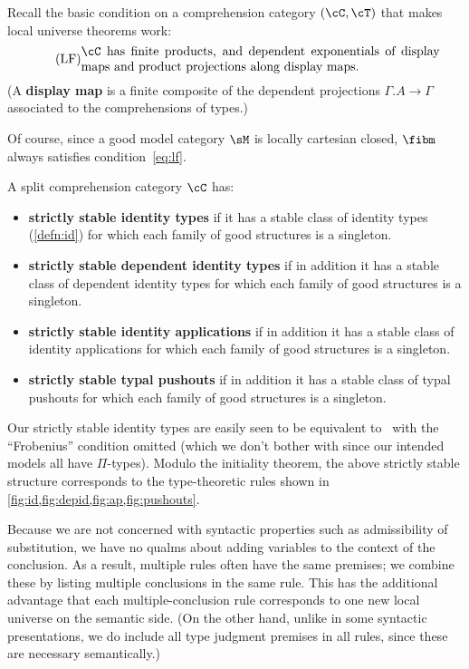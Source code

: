 \documentclass{amsart}
\let\C\cC
\let\T\cT
\begin{document}
Recall the basic condition on a comprehension category $(\C,\T)$ that makes local universe theorems work:
\begin{equation}
  \label{eq:lf}
  \tag{LF} \parbox{10cm}{$\C$ has finite products, and dependent exponentials of display maps and product projections along display maps.}
\end{equation}
(A \textbf{display map} is a finite composite of the dependent projections $\Gamma.A\to\Gamma$ associated to the comprehensions of types.)

Of course, since a good model category $\sM$ is locally cartesian closed, $\fibm$ always satisfies condition~\eqref{eq:lf}.

\begin{defn}
  A split comprehension category $\C$ has:
  \begin{itemize}
  \item \textbf{strictly stable identity types} if it has a stable class of identity types (\cref{defn:id}) for which each family of good structures is a singleton.
  \item \textbf{strictly stable dependent identity types} if in addition it has a stable class of dependent identity types for which each family of good structures is a singleton.
  \item \textbf{strictly stable identity applications} if in addition it has a stable class of identity applications for which each family of good structures is a singleton.
  \item \textbf{strictly stable typal pushouts} if in addition it has a stable class of typal pushouts for which each family of good structures is a singleton.
\end{itemize}
\end{defn}

Our strictly stable identity types are easily seen to be equivalent to~\cite[Definition 3.4.3.1]{lw:localuniv} with the ``Frobenius'' condition omitted (which we don't bother with since our intended models all have $\Pi$-types).
Modulo the initiality theorem, the above strictly stable structure corresponds to the type-theoretic rules shown in \cref{fig:id,fig:depid,fig:ap,fig:pushouts}.

\begin{rmk}\label{rmk:rule-style}
  Because we are not concerned with syntactic properties such as admissibility of substitution, we have no qualms about adding variables to the context of the conclusion.
  As a result, multiple rules often have the same premises; we combine these by listing multiple conclusions in the same rule.
  This has the additional advantage that each multiple-conclusion rule corresponds to one new local universe on the semantic side.
  (On the other hand, unlike in some syntactic presentations, we do include all type judgment premises in all rules, since these are necessary semantically.)
\end{rmk}
\end{document}
